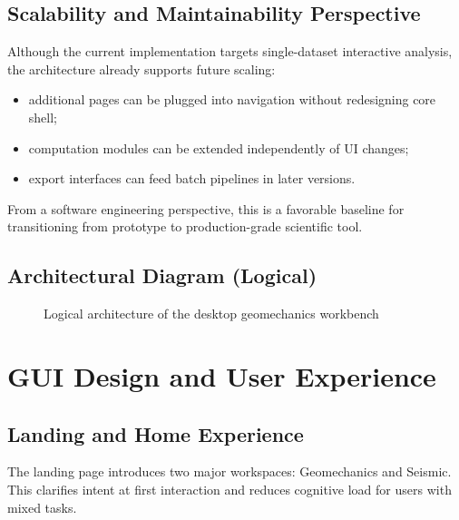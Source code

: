 \documentclass[12pt,a4paper]{report}
\begin{document}
\section{Scalability and Maintainability Perspective}
Although the current implementation targets single-dataset interactive analysis, the architecture already supports future scaling:
\begin{itemize}
    \item additional pages can be plugged into navigation without redesigning core shell;
    \item computation modules can be extended independently of UI changes;
    \item export interfaces can feed batch pipelines in later versions.
\end{itemize}

From a software engineering perspective, this is a favorable baseline for transitioning from prototype to production-grade scientific tool.

\section{Architectural Diagram (Logical)}
\begin{figure}[H]
\centering
{}
\caption{Logical architecture of the desktop geomechanics workbench}
\end{figure}

\chapter{GUI Design and User Experience}
\section{Landing and Home Experience}
The landing page introduces two major workspaces: Geomechanics and Seismic. This clarifies intent at first interaction and reduces cognitive load for users with mixed tasks.
\end{document}
